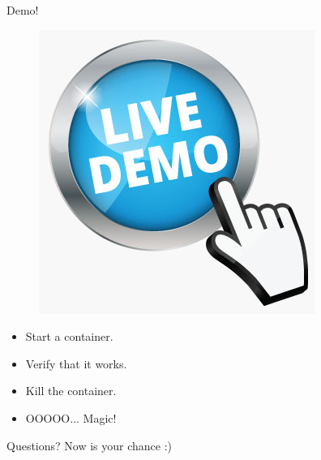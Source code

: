 \documentclass{beamer}
\begin{document}
\begin{frame}{Demo!}
\begin{figure}[htp]
\centering
\includegraphics[scale=0.40]{demo.jpg}
\label{}
\end{figure}
\begin{itemize}
  \item Start a container.
  \item Verify that it works.
  \item Kill the container.
  \item OOOOO... Magic!
\end{itemize}
\end{frame}


\begin{frame}{Questions?}
Now is your chance :)
\end{frame}
\end{document}

